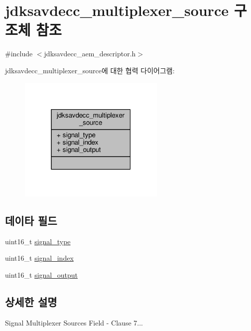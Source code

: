 \hypertarget{structjdksavdecc__multiplexer__source}{}\section{jdksavdecc\+\_\+multiplexer\+\_\+source 구조체 참조}
\label{structjdksavdecc__multiplexer__source}


{\ttfamily \#include $<$jdksavdecc\+\_\+aem\+\_\+descriptor.\+h$>$}



jdksavdecc\+\_\+multiplexer\+\_\+source에 대한 협력 다이어그램\+:
\nopagebreak
\begin{figure}[H]
\begin{center}
\leavevmode
\includegraphics[width=199pt]{structjdksavdecc__multiplexer__source__coll__graph}
\end{center}
\end{figure}
\subsection*{데이타 필드}
\begin{DoxyCompactItemize}
\item 
uint16\+\_\+t \hyperlink{structjdksavdecc__multiplexer__source_a248e60ef99d5ed1779989d1dd6b6dc5a}{signal\+\_\+type}
\item 
uint16\+\_\+t \hyperlink{structjdksavdecc__multiplexer__source_ae2e81a95ee9ad83f1fe22b6a1ee29075}{signal\+\_\+index}
\item 
uint16\+\_\+t \hyperlink{structjdksavdecc__multiplexer__source_ab4b91864e6fc335d7e86536d9f4461e4}{signal\+\_\+output}
\end{DoxyCompactItemize}


\subsection{상세한 설명}
Signal Multiplexer Sources Field -\/ Clause 7... 

